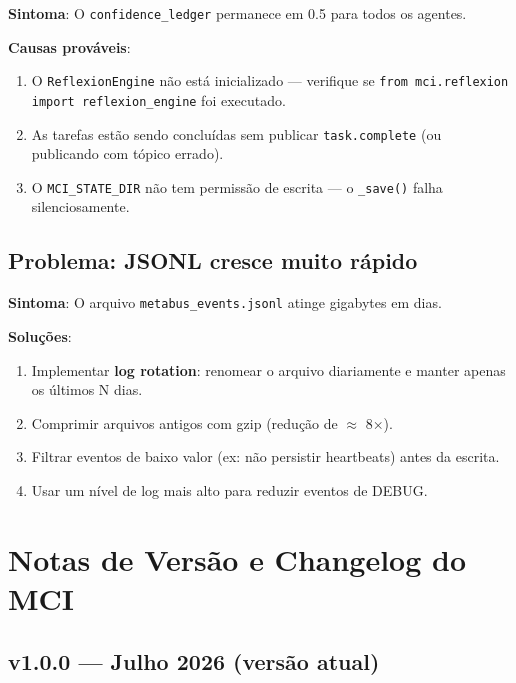 \textbf{Sintoma}: O \texttt{confidence\_ledger} permanece em 0.5 para todos os agentes.

\textbf{Causas prováveis}:
\begin{enumerate}
    \item O \texttt{ReflexionEngine} não está inicializado — verifique se \texttt{from mci.reflexion import reflexion\_engine} foi executado.
    \item As tarefas estão sendo concluídas sem publicar \texttt{task.complete} (ou publicando com tópico errado).
    \item O \texttt{MCI\_STATE\_DIR} não tem permissão de escrita — o \texttt{\_save()} falha silenciosamente.
\end{enumerate}

\subsection{Problema: JSONL cresce muito rápido}

\textbf{Sintoma}: O arquivo \texttt{metabus\_events.jsonl} atinge gigabytes em dias.

\textbf{Soluções}:
\begin{enumerate}
    \item Implementar \textbf{log rotation}: renomear o arquivo diariamente e manter apenas os últimos N dias.
    \item Comprimir arquivos antigos com gzip (redução de $\approx$ 8×).
    \item Filtrar eventos de baixo valor (ex: não persistir heartbeats) antes da escrita.
    \item Usar um nível de log mais alto para reduzir eventos de DEBUG.
\end{enumerate}

\section{Notas de Versão e Changelog do MCI}
\label{sec:changelog}

\subsection{v1.0.0 — Julho 2026 (versão atual)}

